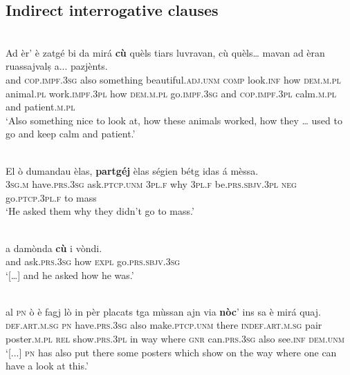 \subsection{Indirect interrogative clauses}

\ea
\label{}
\\
\gll   Ad èr' è zatgé bi da mirá \textbf{cù} quèls tiars luvravan, cù quèls… mavan ad èran ruassajvalṣ a... pazjènts.\\
and \textsc{cop.impf.3sg} also something beautiful.\textsc{adj.unm} \textsc{comp} look.\textsc{inf} how \textsc{dem.m.pl} animal.\textsc{pl} work.\textsc{impf.3pl} how \textsc{dem.m.pl} go.\textsc{impf.3sg} and \textsc{cop.impf.3pl} calm.\textsc{m.pl} and patient.\textsc{m.pl}  \\
\glt `Also something nice to look at, how these animals worked, how they … used to go and keep calm and patient.'
\z

\ea\label{}
 {\citealt[103]{Büchli1966}}\\
\gll    El ò dumandau èlas, \textbf{partgéj} èlas ségien bétg idas á mèssa.\\
\textsc{3sg.m} have.\textsc{prs.3sg} ask.\textsc{ptcp.unm} \textsc{3pl.f} why  \textsc{3pl.f} be.\textsc{prs.sbjv.3pl} \textsc{neg} go.\textsc{ptcp.3pl.f} to mass\\
\glt `He asked them why they didn’t go to mass.'
\z

\ea\label{}
 {\citealt[105]{Büchli1966}}\\
\gll    [...] a damònda \textbf{cù} i vòndi.\\
{} and ask.\textsc{prs.3sg} how \textsc{expl} go.\textsc{prs.sbjv.3sg}\\
\glt `[…] and he asked how he was.'
\z

\ea
\label{}
\\
\gll [...] al \textsc{pn} ò è fagj lò in pèr placats tga mùssan ajn via \textbf{nòc}’ ins sa è mirá quaj.\\
{} \textsc{def.art.m.sg} \textsc{pn} have.\textsc{prs.3sg} also make.\textsc{ptcp.unm} there \textsc{indef.art.m.sg} pair poster.\textsc{m.pl} \textsc{rel} show.\textsc{prs.3pl} in way where \textsc{gnr} can.\textsc{prs.3sg} also see.\textsc{inf} \textsc{dem.unm} \\
\glt `[...] \textsc{pn} has also put there some posters which show on the way where one can have a look at this.'
\z

